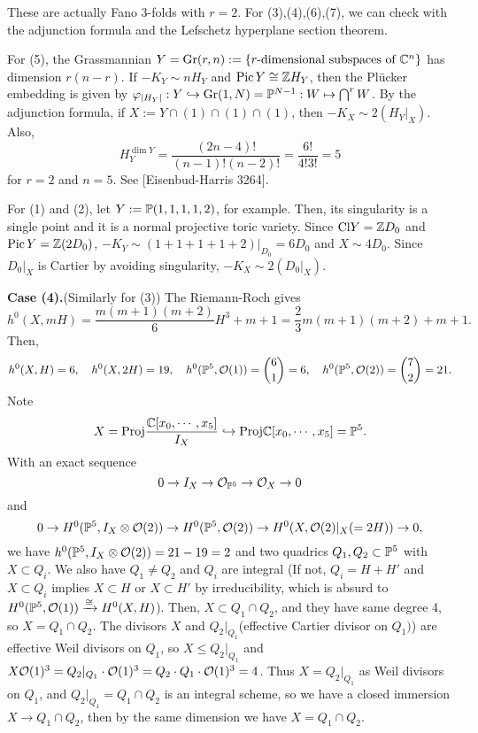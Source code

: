 \documentclass{../../small}
\DeclareMathOperator{\Pic}{Pic}
\begin{document}
\begin{rmk}
These are actually Fano 3-folds with $r=2$.
For (3),(4),(6),(7), we can check with the adjunction formula and the Lefschetz hyperplane section theorem.

For (5), the Grassmannian $Y=\mathrm{Gr}(r,n):=\{\text{$r$-dimensional subspaces of $\C^n$}\}$ has dimension $r(n-r)$.
If $-K_Y\sim nH_Y$ and $\Pic Y\cong\Z H_Y$, then the Pl\"ucker embedding is given by $\f_{|H_Y|}:Y\hookrightarrow\mathrm{Gr}(1,N)=\P^{N-1}:W\mapsto\bigcap^rW$.
By the adjunction formula, if $X:=Y\cap(1)\cap(1)\cap(1)$, then $-K_X\sim2(H_Y|_X)$.
Also,
\[H_Y^{\dim Y}=\frac{(2n-4)!}{(n-1)!(n-2)!}=\frac{6!}{4!3!}=5\]
for $r=2$ and $n=5$.
See [Eisenbud-Harris 3264].

For (1) and (2), let $Y:=\P(1,1,1,1,2)$, for example.
Then, its singularity is a single point and it is a normal projective toric variety.
Since $\mathrm{Cl}Y=\Z D_0$ and $\Pic Y=\Z(2D_0)$, $-K_Y\sim(1+1+1+1+2)|_{D_0}=6D_0$ and $X\sim 4D_0$.
Since $D_0|_X$ is Cartier by avoiding singularity, $-K_X\sim2(D_0|_X)$.
\end{rmk}

\bigskip
\noindent\textbf{Case (4).}(Similarly for (3))
The Riemann-Roch gives
\[h^0(X,mH)=\frac{m(m+1)(m+2)}6H^3+m+1=\frac23m(m+1)(m+2)+m+1.\]
Then,
\[h^0(X,H)=6,\quad h^0(X,2H)=19,\quad h^0(\P^5,\cO(1))={6\choose 1}=6,\quad h^0(\P^5,\cO(2))={7\choose2}=21.\]
Note
\[X=\mathrm{Proj}\frac{\C[x_0,\cdots,x_5]}{I_X}\hookrightarrow\mathrm{Proj}\C[x_0,\cdots,x_5]=\P^5.\]
With an exact sequence
\[0\to I_X\to\cO_{\P^5}\to\cO_X\to0\]
and
\[0\to H^0(\P^5,I_X\otimes\cO(2))\to H^0(\P^5,\cO(2))\to H^0(X,\cO(2)|_X(=2H))\to0,\]
we have $h^0(\P^5,I_X\otimes\cO(2))=21-19=2$ and two quadrics $Q_1,Q_2\subset\P^5$ with $X\subset Q_i$.
We also have $Q_1\ne Q_2$ and $Q_i$ are integral
(If not, $Q_i=H+H'$ and $X\subset Q_i$ implies $X\subset H$ or $X\subset H'$ by irreducibility, which is absurd to $H^0(\P^5,\cO(1))\xrightarrow{\cong}H^0(X,H)$).
Then, $X\subset Q_1\cap Q_2$, and they have same degree 4, so $X=Q_1\cap Q_2$.
The divisors $X$ and $Q_2|_{Q_1}$(effective Cartier divisor on $Q_1)$) are effective Weil divisors on $Q_1$, so $X\le Q_2|_{Q_1}$ and $X\cO(1)^3=Q_2|_{Q_1}\cdot\cO(1)^3=Q_2\cdot Q_1\cdot\cO(1)^3=4$.
Thus $X=Q_2|_{Q_1}$ as Weil divisors on $Q_1$, and $Q_2|_{Q_1}=Q_1\cap Q_2$ is an integral scheme, so we have a closed immersion $X\to Q_1\cap Q_2$, then by the same dimension we have $X=Q_1\cap Q_2$.
\end{document}
